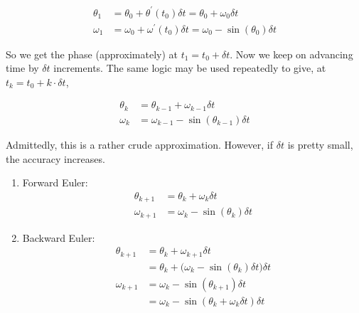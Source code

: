 \documentclass[a4paper,11pt]{report}
\begin{document}
\begin{enumerate}
    \begin{equation*}
    \begin{aligned}
    \theta_1 &= \theta_0 + \theta^{\prime}(t_0) \delta t = \theta_0 + \omega_0 \delta t \\
    \omega_1 &= \omega_0 + \omega^{\prime}(t_0) \delta t = \omega_0 - \sin(\theta_0) \delta t
    \end{aligned}
    \end{equation*}

    So we get the phase (approximately) at $t_1 = t_0 + \delta t$. Now we keep on
    advancing time by $\delta t$ increments. The same logic may be used repeatedly to 
    give, at $t_k = t_0 + k \cdot \delta t$,

    \begin{equation*}
    \begin{aligned}
    \theta_k &= \theta_{k-1} + \omega_{k-1} \delta t \\
    \omega_k &= \omega_{k-1} - \sin(\theta_{k-1}) \delta t
    \end{aligned}
    \end{equation*}

    Admittedly, this is a rather crude approximation. However, if $\delta t$ is pretty
    small, the accuracy increases.

    \begin{enumerate}

    \item Forward Euler:
    \begin{equation*}
    \begin{aligned}
    \theta_{k+1} &= \theta_{k} + \omega_{k} \delta t \\
    \omega_{k+1} &= \omega_{k} - \sin(\theta_{k}) \delta t
    \end{aligned}
    \end{equation*}

    \item Backward Euler:
    \begin{equation*}
    \begin{aligned}
    \theta_{k+1} &= \theta_{k} + \omega_{k+1} \delta t \\
                 &= \theta_{k} + \Big( \omega_{k} - \sin(\theta_{k}) \delta t \Big) \delta t \\
    \omega_{k+1} &= \omega_{k} - \sin(\theta_{k+1}) \delta t \\
                 &= \omega_{k} - \sin(\theta_{k} + \omega_{k} \delta t) \delta t
    \end{aligned}
    \end{equation*}


\end{enumerate}
\end{enumerate}
\end{document}
